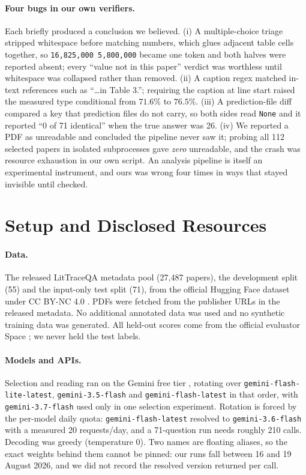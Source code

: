 \documentclass[11pt]{article}
\newcommand{\bk}{\allowbreak}
\begin{document}
\paragraph{Four bugs in our own verifiers.}
Each briefly produced a conclusion we believed. (i) A multiple-choice triage
stripped whitespace before matching numbers, which glues adjacent table cells
together, so \texttt{16,825,000 5,800,000} became one token and both halves were
reported absent; every ``value not in this paper'' verdict was worthless until
whitespace was collapsed rather than removed. (ii) A caption regex matched
in-text references such as ``\ldots in Table 3.''; requiring the caption at line
start raised the measured type conditional from $71.6\%$ to $76.5\%$. (iii) A
prediction-file diff compared a key that prediction files do not carry, so both
sides read \texttt{None} and it reported ``0 of 71 identical'' when the true
answer was 26. (iv) We reported a PDF as unreadable and concluded the pipeline
never saw it; probing all 112 selected papers in isolated subprocesses gave
\emph{zero} unreadable, and the crash was resource exhaustion in our own script.
An analysis pipeline is itself an experimental instrument, and ours was wrong
four times in ways that stayed invisible until checked.

\section{Setup and Disclosed Resources}
\label{sec:setup}

\paragraph{Data.} The released LitTraceQA metadata pool (27{,}487 papers), the
development split (55) and the input-only test split (71), from the official
Hugging Face dataset under CC BY-NC 4.0
\citep{liu2026littraceqabenchmarkmultistagegrounding,littraceqa-data}. PDFs were
fetched from the publisher URLs in the released metadata. No additional annotated
data was used and no synthetic training data was generated. All held-out scores come
from the official evaluator Space \citep{groundlm-eval}; we never held the test
labels.

\paragraph{Models and APIs.} Selection and reading ran on the Gemini free tier
\citep{gemini-models}, rotating over \texttt{gemini-\bk{}flash-\bk{}lite-\bk{}latest},
\texttt{gemini-\bk{}3.5-\bk{}flash} and \texttt{gemini-\bk{}flash-\bk{}latest} in that order, with
\texttt{gemini-\bk{}3.7-\bk{}flash} used only in one selection experiment. Rotation is
forced by the per-model daily quota: \texttt{gemini-\bk{}flash-\bk{}latest} resolved to
\texttt{gemini-\bk{}3.6-\bk{}flash} with a measured 20 requests/day, and a 71-question run
needs roughly 210 calls. Decoding was greedy (temperature $0$). Two names are
floating aliases, so the exact weights behind them cannot be pinned: our runs
fall between 16 and 19 August 2026, and we did not record the resolved version
returned per call.
\end{document}
